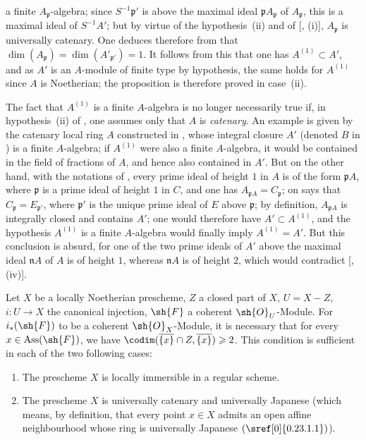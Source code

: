 \begin{corollary}[5.11.2]

a finite $A_\mathfrak{p}$-algebra; since $S^{-1}\mathfrak{p}'$ is above the maximal ideal $\mathfrak{p}A_\mathfrak{p}$ of $A_\mathfrak{p}$, this is a maximal ideal of $S^{-1}A'$; but by virtue of the hypothesis~(ii) and of [, (i)], $A_\mathfrak{p}$ is universally catenary.
One deduces therefore from  that $\dim(A_\mathfrak{p})=\dim(A'_{\mathfrak{p}'})=1$.
It follows from this that one has $A^{(1)}\subset A'$, and as $A'$ is an $A$-module of finite type by hypothesis, the same holds for $A^{(1)}$ since $A$ is Noetherian; the proposition is therefore proved in case~(ii).
\end{corollary}

\begin{remark}[5.11.3]
\label{IV.5.11.3}
The fact that $A^{(1)}$ is a finite $A$-algebra is no longer necessarily true if, in hypothesis~(ii) of , one assumes only that $A$ is \emph{catenary}.
An example is given by the catenary local ring $A$ constructed in , whose integral closure $A'$ (denoted $B$ in ) is a finite $A$-algebra; if $A^{(1)}$ were also a finite $A$-algebra, it would be contained in the field of fractions of $A$, and hence also contained in $A'$.
But on the other hand, with the notations of , every prime ideal of height $1$ in $A$ is of the form $\mathfrak{p}A$, where $\mathfrak{p}$ is a prime ideal of height $1$ in $C$, and one has $A_{\mathfrak{p}A}=C_\mathfrak{p}$; on says  that $C_\mathfrak{p}=E_{\mathfrak{p}'}$, where $\mathfrak{p}'$ is the unique prime ideal of $E$ above $\mathfrak{p}$; by definition, $A_{\mathfrak{p}A}$ is integrally closed and contains $A'$; one would therefore have $A'\subset A^{(1)}$, and the hypothesis $A^{(1)}$ is a finite $A$-algebra would finally imply $A^{(1)}=A'$.
But this conclusion is absurd, for one of the two prime ideals of $A'$ above the maximal ideal $\mathfrak{n}A$ of $A$ is of height $1$, whereas $\mathfrak{n}A$ is of height $2$, which would contradict [, (iv)].
\end{remark}

\begin{corollary}[5.11.4]
\label{IV.5.11.4}
Let $X$ be a locally Noetherian prescheme, $Z$ a closed part of $X$, $U=X-Z$, $i:U\to X$ the canonical injection, $\sh{F}$ a coherent $\sh{O}_U$-Module.
For $i_*(\sh{F})$ to be a coherent $\sh{O}_X$-Module, it is necessary that for every $x\in\operatorname{Ass}(\sh{F})$, we have $\codim(\overline{\{x\}}\cap Z,\overline{\{x\}})\geqslant 2$.
This condition is sufficient in each of the two following cases:
\begin{enumerate}
  \item[\rm(i)] The prescheme $X$ is locally immersible in a regular scheme.
  \item[\rm(ii)] The prescheme $X$ is universally catenary and universally Japanese (which means, by definition, that every point $x\in X$ admits an open affine neighbourhood whose ring is universally Japanese $(\sref[0]{0.23.1.1})$).
\end{enumerate}
\end{corollary}

